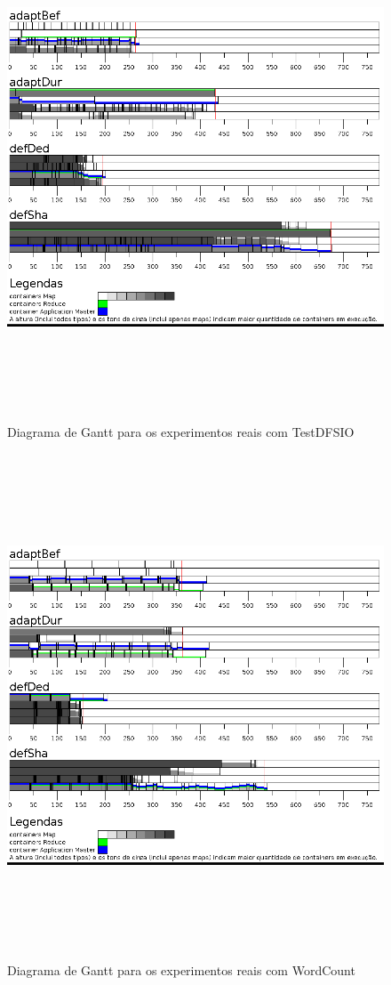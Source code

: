 \begin{figure}[!ht]
	\centering
	\includegraphics[height=15cm]{figuras/DFS-real.png}
	\caption{Diagrama de Gantt para os experimentos reais com TestDFSIO}
	\label{fig:exp2IO}
\end{figure}

\begin{figure}[!ht]
	\centering
	\includegraphics[height=15cm]{figuras/WC-real.png}
	\caption{Diagrama de Gantt para os experimentos reais com WordCount}
	\label{fig:exp2WC}
\end{figure}

